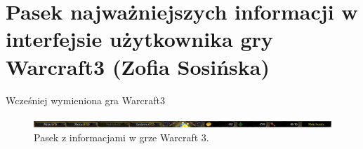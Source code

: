 \section{Pasek najważniejszych informacji w interfejsie użytkownika gry Warcraft3 (Zofia Sosińska)}
Wcześniej wymieniona gra Warcraft3


\begin{figure}[htbp]
    \centering
    \includegraphics[width=1.0\textwidth]{images/ui/warcraft3_gorny_pasek.png}
    \caption{Pasek z informacjami w grze Warcraft 3.}\label{fig:Warcraft3}
\end{figure}